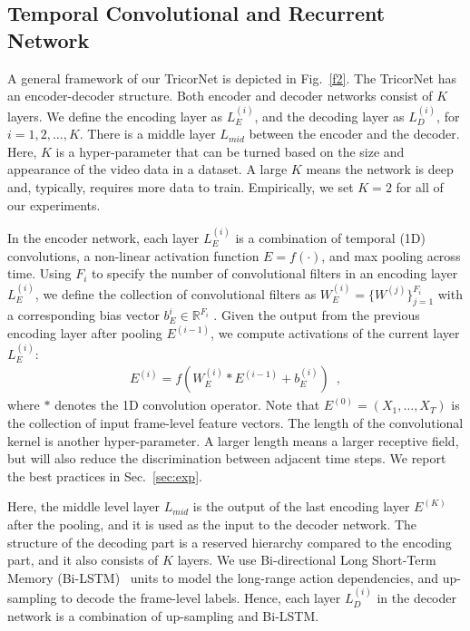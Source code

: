 \documentclass{article}
\begin{document}
\subsection{Temporal Convolutional and Recurrent Network}

A general framework of our TricorNet is depicted in Fig.~\ref{f2}. The TricorNet has an encoder-decoder structure. Both encoder and decoder networks consist of $K$ layers. We define the encoding layer as $L_{E}^{(i)}$, and the decoding layer as $L_{D}^{(i)}$, for $i = 1,2,\dots,K$. There is a middle layer $L_{mid}$ between the encoder and the decoder. Here, $K$ is a hyper-parameter that can be turned based on the size and appearance of the video data in a dataset. A large $K$ means the network is deep and, typically, requires more data to train. Empirically, we set $K=2$ for all of our experiments. 

In the encoder network, each layer $L_{E}^{(i)}$ is a combination of temporal (1D) convolutions, a non-linear activation function $E = f(\cdot)$, and max pooling across time. Using $F_i$ to specify the number of convolutional filters in an encoding layer $L_{E}^{(i)}$, we define the collection of convolutional filters as $W_E^{(i)} = \{W^{(j)} \}^{F_i}_{j=1}$ with a corresponding bias vector $b_E^{i} \in \mathbb{R}^{F_i}$ . Given the output from the previous encoding layer after pooling $E^{(i-1)}$, we compute activations of the current layer $L_{E}^{(i)}$: 
%
\begin{align}
E^{(i)} = f(W_E^{(i)} * E^{(i-1)} + b_E^{(i)})
\enspace,
\end{align}
%
where $*$ denotes the 1D convolution operator. Note that $E^{(0)} = (X_1, \dots, X_T)$ is the collection of input frame-level feature vectors. The length of the convolutional kernel is another hyper-parameter. A larger length means a larger receptive field, but will also reduce the discrimination between adjacent time steps. We report the best practices in Sec.~\ref{sec:exp}.

Here, the middle level layer $L_{mid}$ is the output of the last encoding layer $E^{(K)}$ after the pooling, and it is used as the input to the decoder network. The structure of the decoding part is a reserved hierarchy compared to the encoding part, and it also consists of $K$ layers. We use Bi-directional Long Short-Term Memory (Bi-LSTM)~\cite{graves2005bidirectional} units to model the long-range action dependencies, and up-sampling to decode the frame-level labels. Hence, each layer $L_{D}^{(i)}$ in the decoder network is a combination of up-sampling and Bi-LSTM. 
\end{document}
